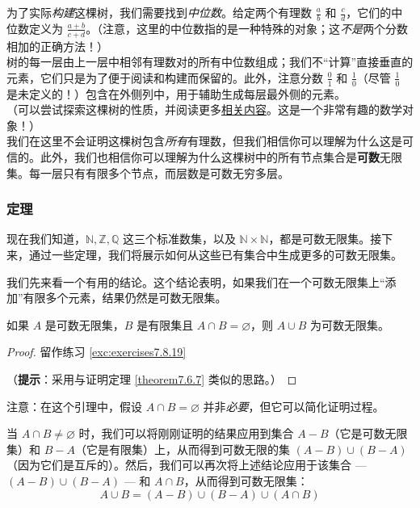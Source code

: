 \begin{example}
\begin{enumerate}[label=(\arabic*)]
              为了实际\emph{构建}这棵树，我们需要找到\emph{中位数}。给定两个有理数 $\frac{a}{b}$ 和 $\frac{c}{d}$，它们的中位数定义为 $\frac{a+b}{c+d}$。（注意，这里的中位数指的是一种特殊的对象；这\emph{不是}两个分数相加的正确方法！）\\

              树的每一层由上一层中相邻有理数对的所有中位数组成；我们不``计算''直接垂直的元素，它们只是为了便于阅读和构建而保留的。此外，注意分数 $\frac{0}{1}$ 和 $\frac{1}{0}$（尽管 $\frac{1}{0}$ 是未定义的！）包含在外侧列中，用于辅助生成每层最外侧的元素。\\

              （可以尝试探索这棵树的性质，并阅读更多\href{https://en.wikipedia.org/wiki/Stern%E2%80%93Brocot_tree}{相关内容}。这是一个非常有趣的数学对象！）\\

              我们在这里不会证明这棵树包含\emph{所有}有理数，但我们相信你可以理解为什么这是可信的。此外，我们也相信你可以理解为什么这棵树中的所有节点集合是\textbf{可数}无限集。每一层只有有限多个节点，而层数是可数无穷多层。
    \end{enumerate}

\end{example}

\subsubsection*{定理}

现在我们知道，$\mathbb{N}, \mathbb{Z}, \mathbb{Q}$ 这三个标准数集，以及 $\mathbb{N} \times \mathbb{N}$，都是可数无限集。接下来，通过一些定理，我们将展示如何从这些已有集合中生成更多的可数无限集。

我们先来看一个有用的结论。这个结论表明，如果我们在一个可数无限集上``添加''有限多个元素，结果仍然是可数无限集。

\begin{lemma}\label{lemma7.6.16}
    如果 $A$ 是可数无限集，$B$ 是有限集且 $A \cap B = \varnothing$，则 $A \cup B$ 为可数无限集。
\end{lemma}

\begin{proof}
    留作练习 \ref{exc:exercises7.8.19}

    （\textbf{提示}：采用与证明定理 \ref{theorem7.6.7} 类似的思路。）
\end{proof}

\begin{remark}
    注意：在这个引理中，假设 $A \cap B = \varnothing$ 并非\emph{必要}，但它可以简化证明过程。

    当 $A \cap B \ne \varnothing$ 时，我们可以将刚刚证明的结果应用到集合 $A - B$（它是可数无限集）和 $B - A$（它是有限集）上，从而得到可数无限的集 $(A - B) \cup (B - A)$（因为它们是互斥的）。然后，我们可以再次将上述结论应用于该集合 --- $(A - B) \cup (B - A)$ --- 和 $A \cap B$，从而得到可数无限集：
    \[A \cup B = (A - B) \cup (B - A) \cup (A \cap B)\]
\end{remark}

